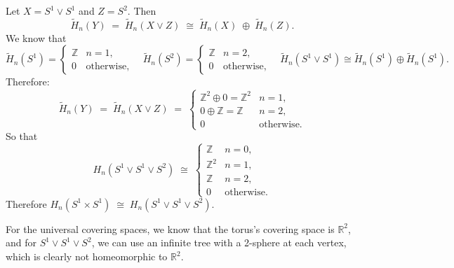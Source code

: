 \documentclass[12pt]{article}
\newcommand{\R}{\mathbb{R}}
\begin{document}
\begin{newproof}
  Let $X = S^1 \vee S^1$ and $Z = S^2$. Then
  $$ \widetilde{H}_n(Y) \;=\; \widetilde{H}_n(X \vee Z) 
    \;\cong\; 
    \widetilde{H}_n(X) \;\oplus\; \widetilde{H}_n(Z). $$
  We know that 
  $$ \widetilde{H}_n(S^1) = 
    \begin{cases}
      \mathbb{Z} & n=1,\\
      0 & \text{otherwise},
    \end{cases}
    \quad
    \widetilde{H}_n(S^2) =
      \begin{cases}
        \mathbb{Z} & n=2,\\
        0 & \text{otherwise},
      \end{cases}
      \quad
      \widetilde{H}_n(S^1 \vee S^1) \cong \widetilde{H}_n(S^1) \oplus \widetilde{H}_n(S^1). $$
  Therefore:
  $$ \widetilde{H}_n(Y) 
      \;=\;
    \widetilde{H}_n(X \vee Z)
    \;=\;
    \begin{cases}
      \mathbb{Z}^2 \oplus 0 = \mathbb{Z}^2 & n=1,\\
      0 \oplus \mathbb{Z} = \mathbb{Z} & n=2,\\
      0 & \text{otherwise}.
    \end{cases} $$
  So that
  $$ H_n(S^1 \vee S^1 \vee S^2) 
    \;\cong\;
    \begin{cases}
      \mathbb{Z} & n=0,\\
      \mathbb{Z}^2 & n=1,\\
      \mathbb{Z} & n=2,\\
      0 & \text{otherwise}.
    \end{cases} $$
  Therefore $H_n(S^1 \times S^1) \;\cong\; H_n(S^1 \vee S^1 \vee S^2).$

  For the universal covering spaces, we know that the torus's covering space is $\R^2$, and for $S^1 \vee S^1 \vee S^2$, we can use an infinite tree with a 2-sphere at each vertex, which is clearly not homeomorphic to $\mathbb{R}^2$.
\end{newproof}
\end{document}
